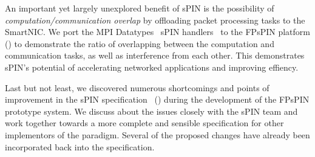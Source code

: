 An important yet largely unexplored benefit of sPIN is the possibility of \emph{computation/communication overlap} by offloading packet processing tasks to the SmartNIC.  We port the MPI Datatypes~\cite{ropo_processing_2009} sPIN handlers~\cite{di_girolamo_network-accelerated_2019} to the FPsPIN platform () to demonstrate the ratio of overlapping between the computation and communication tasks, as well as interference from each other.  This demonstrates sPIN's potential of accelerating networked applications and improving effiency.

Last but not least, we discovered numerous shortcomings and points of improvement in the sPIN specification~\cite{hoefler_spin_2017} () during the development of the FPsPIN prototype system.  We discuss about the issues closely with the sPIN team and work together towards a more complete and sensible specification for other implementors of the paradigm.  Several of the proposed changes have already been incorporated back into the specification.